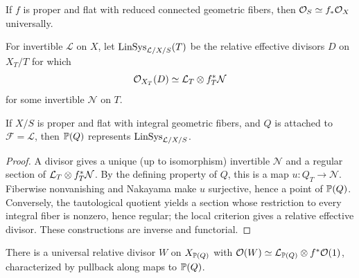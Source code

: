 \begin{remark}\label{kps-ex-universal-functions}
If $f$ is proper and flat with reduced connected geometric fibers, then
$\mathcal O_S\simeq f_*\mathcal O_X$ universally.
\end{remark}

\begin{definition}\label{kps-def-linear-system-functor}
For invertible $\mathcal L$ on $X$, let $\operatorname{LinSys}_{\mathcal L/X/S}(T)$ be the
relative effective divisors $D$ on $X_T/T$ for which
\[\mathcal O_{X_T}(D)\simeq\mathcal L_T\otimes f_T^*\mathcal N\]
for some invertible $\mathcal N$ on $T$.
\end{definition}

\begin{theorem}\label{kps-thm-linear-systems}
If $X/S$ is proper and flat with integral geometric fibers, and $Q$ is attached
to $\mathcal F=\mathcal L$, then $\mathbb P(Q)$ represents
$\operatorname{LinSys}_{\mathcal L/X/S}$.
\end{theorem}
\begin{proof}
A divisor gives a unique (up to isomorphism) invertible $\mathcal N$ and a
regular section of $\mathcal L_T\otimes f_T^*\mathcal N$. By the defining property
of $Q$, this is a map $u:Q_T\to\mathcal N$. Fiberwise nonvanishing and
Nakayama make $u$ surjective, hence a point of $\mathbb P(Q)$. Conversely, the
tautological quotient yields a section whose restriction to every integral
fiber is nonzero, hence regular; the local criterion gives a relative effective
divisor. These constructions are inverse and functorial.
\end{proof}

\begin{remark}\label{kps-ex-universal-divisor}
There is a universal relative divisor $W$ on $X_{\mathbb P(Q)}$ with
$\mathcal O(W)\simeq\mathcal L_{\mathbb P(Q)}\otimes f^*\mathcal O(1)$, characterized by
pullback along maps to $\mathbb P(Q)$.
\end{remark}
